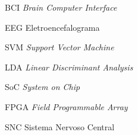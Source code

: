 \begin{siglas}
  \item[BCI] \textit{Brain Computer Interface}
  \item[EEG] Eletroencefalograma
  \item[SVM] \textit{Support Vector Machine}
  \item[LDA] \textit{Linear Discriminant Analysis}
  \item[SoC] \textit{System on Chip}
  \item[FPGA] \textit{Field Programmable Array}
  \item[SNC] Sistema Nervoso Central

\end{siglas}
